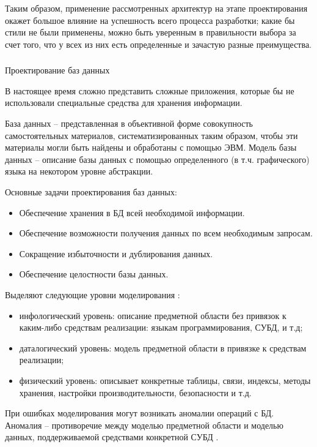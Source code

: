 Таким образом, применение рассмотренных архитектур на этапе проектирования окажет большое влияние на успешность всего
процесса разработки; какие бы стили не были применены, можно быть уверенным в правильности выбора за счет того, что
у всех из них есть определенные и зачастую разные преимущества.

\subsubsection{} Проектирование баз данных
\label{sec:analysis:literature:db}

В настоящее время сложно представить сложные приложения, которые бы не использовали специальные средства для хранения
информации.

База данных -- представленная в объективной форме совокупность самостоятельных материалов, систематизированных таким
образом, чтобы эти материалы могли быть найдены и обработаны с помощью ЭВМ. Модель базы данных -- описание базы данных
с помощью  определенного (в т.ч. графического) языка на некотором уровне абстракции.

Основные задачи проектирования баз данных:
\begin{itemize}
	\item Обеспечение хранения в БД всей необходимой информации.
	\item Обеспечение возможности получения данных по всем необходимым запросам.
	\item Сокращение избыточности и дублирования данных.
	\item Обеспечение целостности базы данных.
\end{itemize}

Выделяют следующие уровни моделирования \cite{kulikov_db_workbook}:
\begin{itemize}
	\item инфологический уровень: описание предметной области без привязок к каким-либо средствам реализации: языкам
	программирования, СУБД, и т.д;
	\item даталогический уровень: модель предметной области в привязке к средствам реализации;
	\item физический уровень: описывает конкретные таблицы, связи, индексы, методы хранения, настройки производительности,
	безопасности и т.д.
\end{itemize}

При ошибках моделирования могут возникать аномалии операций с БД. Аномалия -- противоречие между моделью предметной
области и моделью данных, поддерживаемой средствами конкретной СУБД \cite{kulikov_db_workbook}.

